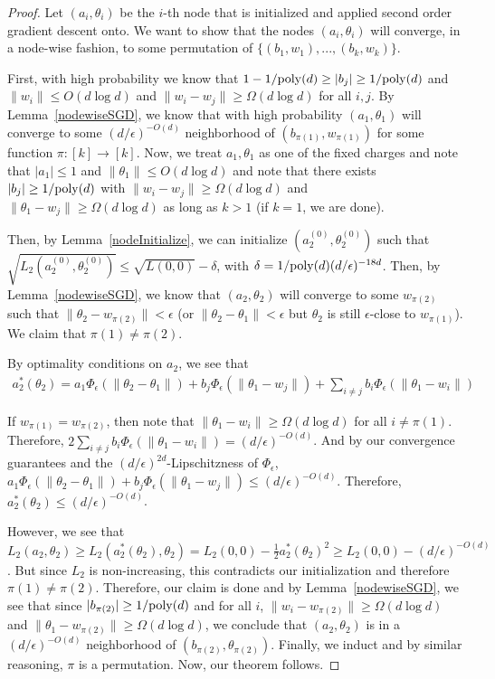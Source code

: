\begin{proof}
Let $(a_i, \theta_i)$ be the $i$-th node that is initialized and applied second order gradient descent onto. We want to show that the nodes $(a_i, \theta_i)$ will converge, in a node-wise fashion, to some permutation of $\{(b_1,w_1),...,(b_k,w_k)\}$. 

First, with high probability we know that $1 - 1/\mathrm{poly}(d) \geq |b_j| \geq 1/\mathrm{poly}(d)$ and $\|w_i\|\leq O(d\log d)$ and $\|w_i - w_j \| \geq \Omega(d\log d)$ for all $i, j$. By Lemma~\ref{nodewiseSGD}, we know that with high probability $(a_1,\theta_1)$ will converge to some $(d/\epsilon)^{-O(d)}$ neighborhood of $(b_{\pi(1)}, w_{\pi(1)})$ for some function $\pi: [k] \to [k]$. Now, we treat $a_1, \theta_1$ as one of the fixed charges and note that $|a_1| \leq 1$ and $\|\theta_1\| \leq O(d\log d)$ and note that there exists $|b_j| \geq 1/\mathrm{poly}(d)$ with $\|w_i - w_j\| \geq \Omega(d\log d)$ and $\|\theta_1 - w_j \| \geq \Omega(d\log d)$ as long as $k > 1$ (if $k = 1$, we are done). 

Then, by Lemma~\ref{nodeInitialize}, we can initialize $(a_2^{(0)}, \theta_2^{(0)})$ such that $\sqrt{L_2(a_2^{(0)}, \theta_2^{(0)})} \leq \sqrt{L(0,0)} - \delta$, with $\delta = 1/\mathrm{poly}(d) (d/\epsilon)^{-18d}$. Then, by Lemma~\ref{nodewiseSGD}, we know that $(a_2, \theta_2)$ will converge to some $w_{\pi(2)}$ such that $\|\theta_2 - w_{\pi(2)}\| <\epsilon$ (or $\|\theta_2 - \theta_1 \| < \epsilon$ but $\theta_2$ is still $\epsilon$-close to $w_{\pi(1)}$). We claim that $\pi(1) \neq \pi(2)$.

By optimality conditions on $a_2$, we see that 
\begin{align*}
a_2^*(\theta_2) = a_1 \Phi_{\epsilon}(\|\theta_2 - \theta_1\|) + b_j \Phi_{\epsilon}(\|\theta_1 - w_j\|) +  \sum_{i \neq j} b_i \Phi_{\epsilon}(\|\theta_1 - w_i\|)
\end{align*}

If $w_{\pi(1)} = w_{\pi(2)}$, then note that $\|\theta_1 - w_i \| \geq \Omega(d\log d)$ for all $i \neq \pi(1)$. Therefore, $2 \sum_{i \neq j} b_i \Phi_{\epsilon}(\|\theta_1 - w_i\|) = (d/\epsilon)^{-O(d)}$. And by our convergence guarantees and the $(d/\epsilon)^{2d}$-Lipschitzness of $\Phi_{\epsilon}$, $ a_1 \Phi_{\epsilon}(\|\theta_2 - \theta_1\|) + b_j \Phi_{\epsilon}(\|\theta_1 - w_j\|) \leq (d/\epsilon)^{-O(d)}$. Therefore, $a_2^*(\theta_2) \leq (d/\epsilon)^{-O(d)}$. 

However, we see that $L_2(a_2, \theta_2) \geq L_2(a_2^*(\theta_2),\theta_2) = L_2(0,0) - \frac{1}{2}a_2^*(\theta_2)^2 \geq L_2(0,0) - (d/\epsilon)^{-O(d)}$. But since $L_2$ is non-increasing, this contradicts our initialization and therefore $\pi(1) \neq \pi(2)$. Therefore, our claim is done and by Lemma~\ref{nodewiseSGD}, we see that since $|b_{\pi(2)}| \geq 1/\mathrm{poly}(d)$ and for all $i$, $\|w_i - w_{\pi(2)}\| \geq \Omega(d \log d)$ and $\|\theta_1 - w_{\pi(2)}\| \geq \Omega(d\log d)$, we conclude that $(a_2,\theta_2)$ is in a $(d/\epsilon)^{-O(d)}$ neighborhood of $(b_{\pi(2)}, \theta_{\pi(2)})$. Finally, we induct and by similar reasoning, $\pi$ is a permutation. Now, our theorem follows. 
\end{proof}

